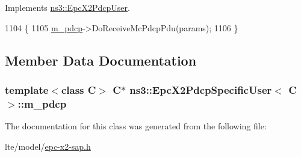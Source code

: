 Implements \hyperlink{classns3_1_1EpcX2PdcpUser_a870fce98cffe8e466c65102e993dd354}{ns3\+::\+Epc\+X2\+Pdcp\+User}.


\begin{DoxyCode}
1104 \{
1105   \hyperlink{classns3_1_1EpcX2PdcpSpecificUser_abf1849d023d72b8f8d131f0ebd54770a}{m\_pdcp}->DoReceiveMcPdcpPdu(params);
1106 \}
\end{DoxyCode}


\subsection{Member Data Documentation}
\subsubsection[{\texorpdfstring{m\+\_\+pdcp}{m_pdcp}}]{\setlength{\rightskip}{0pt plus 5cm}template$<$class C$>$ {\bf C}$\ast$ {\bf ns3\+::\+Epc\+X2\+Pdcp\+Specific\+User}$<$ {\bf C} $>$\+::m\+\_\+pdcp\hspace{0.3cm}{\ttfamily [private]}}\hypertarget{classns3_1_1EpcX2PdcpSpecificUser_abf1849d023d72b8f8d131f0ebd54770a}{}\label{classns3_1_1EpcX2PdcpSpecificUser_abf1849d023d72b8f8d131f0ebd54770a}


The documentation for this class was generated from the following file\+:\begin{DoxyCompactItemize}
\item 
lte/model/\hyperlink{epc-x2-sap_8h}{epc-\/x2-\/sap.\+h}\end{DoxyCompactItemize}

